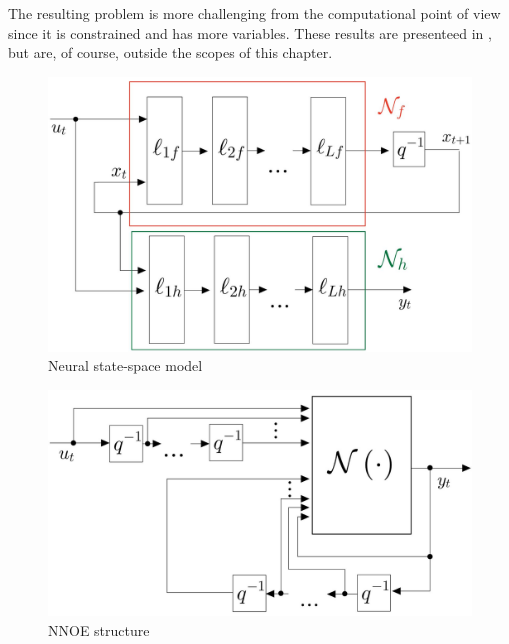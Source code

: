 The resulting problem is more challenging from the computational point of view since it is constrained and has more variables. These results are presenteed in \citeauthor{cerone2024new}, \cite{cerone2024new} but are, of course, outside the scopes of this chapter.

\begin{figure}
    \centering
    \includegraphics[scale=0.25]{img/NeuralSS.jpeg}
    \caption{Neural state-space model} 
\end{figure}

\begin{figure}
    \centering
    \includegraphics[scale=0.25]{img/NNOE.jpeg}
    \caption{NNOE structure} 
\end{figure}